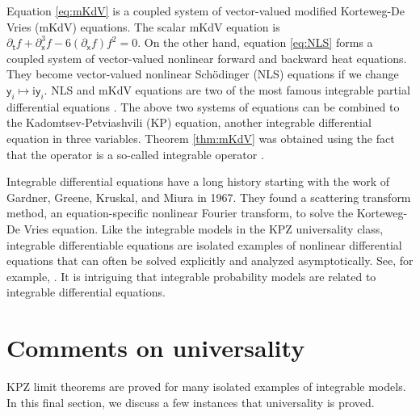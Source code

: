 \documentclass[10pt]{article}
\theoremstyle{plain}
\theoremstyle{definition}
\newcommand{\ii}{\mathrm{i}}
\newcommand{\kmath}{\mathsf}  %
\newcommand{\kp}{\kmath{p}}  %
\newcommand{\kr}{\kmath{r}}  %
\newcommand{\knt}{\kmath{t}}  %
\newcommand{\kny}{\kmath{y}}  %
\newcommand{\knx}{\kmath{x}}  %
\numberwithin{equation}{section}
\begin{document}
Equation \eqref{eq:mKdV} is a coupled system of vector-valued modified Korteweg-De Vries (mKdV) equations. 
The scalar mKdV equation is 
$\partial_{\knt} f + \partial_{\knx}^3 f - 6 (\partial_{\knx} f) f^2  =0$. 
On the other hand,  equation \eqref{eq:NLS} forms a coupled system of vector-valued nonlinear forward and backward heat equations. 
They become vector-valued nonlinear Sch{\"o}dinger (NLS) equations if we change $\kny_i\mapsto \ii \kny_i$. 
NLS and mKdV equations are two of the most famous integrable partial differential equations \cite{Ablowitz-Clarkson91}. 
The above two systems of equations can be combined to the Kadomtsev-Petviashvili (KP) equation, another integrable differential equation in three variables.
Theorem \ref{thm:mKdV} was obtained using the fact that the operator is a so-called integrable operator \cite{IIKS, Deift99b}. 


Integrable differential equations have a long history starting with the work of Gardner, Greene, Kruskal, and Miura in 1967. 
They found a scattering transform method, an equation-specific nonlinear Fourier transform, to solve the Korteweg-De Vries equation.  
Like the integrable models in the KPZ universality class, integrable differentiable equations are isolated examples of nonlinear differential equations that can often be solved explicitly and analyzed asymptotically. See, for example, \cite{Ablowitz-Clarkson91, Deift19}. 
It is intriguing that integrable probability models are related to integrable differential equations. 





\section{Comments on universality} \label{sec:univ}

KPZ limit theorems are proved for many isolated examples of integrable models. %
In this final section, we discuss a few instances that universality is proved. 
\end{document}
